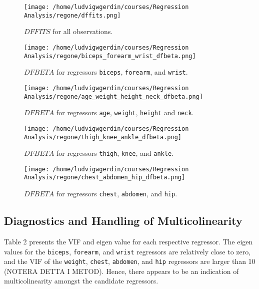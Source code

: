 \documentclass[11pt]{article}
\begin{document}
\begin{figure}[h]
\centering
\texttt{[image: /home/ludvigwgerdin/courses/Regression Analysis/regone/dffits.png]}
\caption{\label{fig:orga0db808}
\(DFFITS\) for all observations.}
\end{figure}

\begin{figure}[h]
\centering
\texttt{[image: /home/ludvigwgerdin/courses/Regression Analysis/regone/biceps\_forearm\_wrist\_dfbeta.png]}
\caption{\label{fig:orge336683}
\(DFBETA\) for regressors \texttt{biceps}, \texttt{forearm}, and \texttt{wrist}.}
\end{figure}

\begin{figure}[h]
\centering
\texttt{[image: /home/ludvigwgerdin/courses/Regression Analysis/regone/age\_weight\_height\_neck\_dfbeta.png]}
\caption{\label{fig:org9cdf727}
\(DFBETA\) for regressors \texttt{age}, \texttt{weight}, \texttt{height} and \texttt{neck}.}
\end{figure}

\begin{figure}[h]
\centering
\texttt{[image: /home/ludvigwgerdin/courses/Regression Analysis/regone/thigh\_knee\_ankle\_dfbeta.png]}
\caption{\label{fig:orgf4896d2}
\(DFBETA\) for regressors \texttt{thigh}, \texttt{knee}, and \texttt{ankle}.}
\end{figure}

\begin{figure}[h]
\centering
\texttt{[image: /home/ludvigwgerdin/courses/Regression Analysis/regone/chest\_abdomen\_hip\_dfbeta.png]}
\caption{\label{fig:orgde81c17}
\(DFBETA\) for regressors \texttt{chest}, \texttt{abdomen}, and \texttt{hip}.}
\end{figure}

\subsection{Diagnostics and Handling of Multicolinearity}
\label{sec:org4d49d9c}

Table 2 presents the VIF and eigen value for each respective regressor. The eigen values for the \texttt{biceps},
\texttt{forearm}, and \texttt{wrist} regressors are relatively close to zero, and the VIF of the \texttt{weight},
\texttt{chest}, \texttt{abdomen}, and \texttt{hip} regressors are larger than 10 (NOTERA DETTA I METOD). Hence, there appears 
to be an indication of multicolinearity amongst the candidate regressors.
\end{document}
